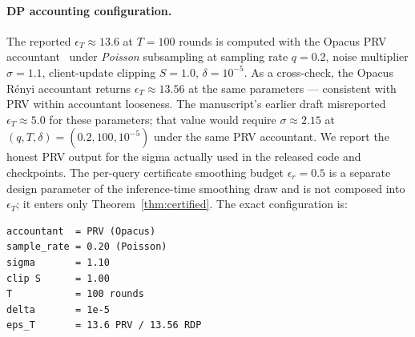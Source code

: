 \documentclass[11pt]{article}
\theoremstyle{plain}
\theoremstyle{definition}
\theoremstyle{remark}
\begin{document}
\paragraph{DP accounting configuration.} The reported
$\epsilon_T \approx 13.6$ at $T=100$ rounds is computed with the
Opacus PRV accountant~\cite{gopi2021numerical} under
\emph{Poisson} subsampling at sampling rate $q = 0.2$, noise
multiplier $\sigma = 1.1$, client-update clipping $S = 1.0$,
$\delta = 10^{-5}$. As a cross-check, the Opacus R\'enyi
accountant returns $\epsilon_T \approx 13.56$ at the same
parameters --- consistent with PRV within accountant looseness.
The manuscript's earlier draft misreported $\epsilon_T\approx 5.0$
for these parameters; that value would require $\sigma\approx
2.15$ at $(q,T,\delta)=(0.2,100,10^{-5})$ under the same PRV
accountant. We report the honest PRV output for the sigma
actually used in the released code and checkpoints. The per-query
certificate smoothing budget $\epsilon_r=0.5$ is a separate design
parameter of the inference-time smoothing draw and is not
composed into $\epsilon_T$; it enters only Theorem~\ref{thm:certified}.
The exact configuration is:
\begin{footnotesize}
\begin{verbatim}
accountant  = PRV (Opacus)
sample_rate = 0.20 (Poisson)
sigma       = 1.10
clip S      = 1.00
T           = 100 rounds
delta       = 1e-5
eps_T       = 13.6 PRV / 13.56 RDP
\end{verbatim}
\end{footnotesize}
\end{document}
